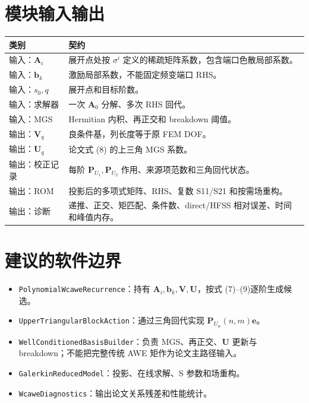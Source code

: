 \documentclass[11pt,a4paper]{ctexart}
\newcommand{\A}{\bm A}
\newcommand{\bvec}{\bm b}
\newcommand{\evec}{\bm e}
\newcommand{\Umat}{\bm U}
\newcommand{\Vmat}{\bm V}
\begin{document}
\section{模块输入输出}
\begin{longtable}{>{\raggedright\arraybackslash}p{}p{}}
\toprule 类别 & 契约 \\
\midrule
输入：$\A_i$ & 展开点处按 $\sigma^i$ 定义的稀疏矩阵系数，包含端口色散局部系数。\\
输入：$\bvec_k$ & 激励局部系数，不能固定频变端口 RHS。\\
输入：$s_0,q$ & 展开点和目标阶数。\\
输入：求解器 & 一次 $\A_0$ 分解、多次 RHS 回代。\\
输入：MGS & Hermitian 内积、再正交和 breakdown 阈值。\\
输出：$\Vmat_q$ & 良条件基，列长度等于原 FEM DOF。\\
输出：$\Umat_q$ & 论文式 (8) 的上三角 MGS 系数。\\
输出：校正记录 & 每阶 $\bm P_{U_1},\bm P_{U_2}$ 作用、来源项范数和三角回代状态。\\
输出：ROM & 投影后的多项式矩阵、RHS、复数 S11/S21 和按需场重构。\\
输出：诊断 & 递推、正交、矩匹配、条件数、direct/HFSS 相对误差、时间和峰值内存。\\
\bottomrule
\end{longtable}

\section{建议的软件边界}
\begin{itemize}
\item \texttt{PolynomialWcaweRecurrence}：持有 $\A_i,\bvec_k,\Vmat,\Umat$，按式 (7)--(9)逐阶生成候选。
\item \texttt{UpperTriangularBlockAction}：通过三角回代实现 $\bm P_{U_w}(n,m)\evec$。
\item \texttt{WellConditionedBasisBuilder}：负责 MGS、再正交、$\Umat$ 更新与 breakdown；不能把完整传统 AWE 矩作为论文主路径输入。
\item \texttt{GalerkinReducedModel}：投影、在线求解、S 参数和场重构。
\item \texttt{WcaweDiagnostics}：输出论文关系残差和性能统计。
\end{itemize}
\end{document}
